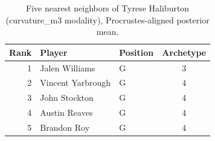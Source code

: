 \begin{table}[htbp]
  \centering\small
  \begin{tabular}{rllc}
    \toprule
    Rank & Player & Position & Archetype \\
    \midrule
    1 & Jalen Williams & G & 3 \\
    2 & Vincent Yarbrough & G & 4 \\
    3 & John Stockton & G & 4 \\
    4 & Austin Reaves & G & 4 \\
    5 & Brandon Roy & G & 4 \\
    \bottomrule
  \end{tabular}
  \caption{Five nearest neighbors of Tyrese Haliburton (curvature_m3 modality), Procrustes-aligned posterior mean.}
  \label{tab:Tyrese_Haliburton_neighbors_curvature_m3}
\end{table}

